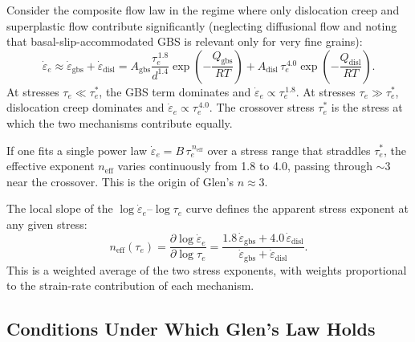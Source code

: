 \documentclass[11pt]{article}
\begin{document}
\begin{tcolorbox}[
  colback=orange!25,
  colframe=orange!70!black,
  title={\textbf{Derivation: $n \approx 3$ as a transitional value \cite{RanganathanMinchew2024}}}
]
Consider the composite flow law in the regime where only dislocation creep and superplastic flow contribute significantly (neglecting diffusional flow and noting that basal-slip-accommodated GBS is relevant only for very fine grains):
\begin{equation}
  \dot{\varepsilon}_e \approx \dot{\varepsilon}_{\text{gbs}} + \dot{\varepsilon}_{\text{disl}} = A_{\text{gbs}} \frac{\tau_e^{\,1.8}}{d^{1.4}} \exp\!\left(-\frac{Q_{\text{gbs}}}{RT}\right) + A_{\text{disl}}\, \tau_e^{\,4.0} \exp\!\left(-\frac{Q_{\text{disl}}}{RT}\right).
  \label{eq:two_mechanism}
\end{equation}
At stresses $\tau_e \ll \tau_e^*$, the GBS term dominates and $\dot{\varepsilon}_e \propto \tau_e^{\,1.8}$.  At stresses $\tau_e \gg \tau_e^*$, dislocation creep dominates and $\dot{\varepsilon}_e \propto \tau_e^{\,4.0}$.  The crossover stress $\tau_e^*$ is the stress at which the two mechanisms contribute equally.

\medskip
\noindent If one fits a single power law $\dot{\varepsilon}_e = B\,\tau_e^{\,n_{\text{eff}}}$ over a stress range that straddles $\tau_e^*$, the effective exponent $n_{\text{eff}}$ varies continuously from 1.8 to 4.0, passing through $\sim$3 near the crossover.  This is the origin of Glen's $n \approx 3$.

\medskip
\noindent The local slope of the $\log\dot{\varepsilon}_e$--$\log\tau_e$ curve defines the apparent stress exponent at any given stress:
\begin{equation}
  n_{\text{eff}}(\tau_e) = \frac{\partial \log \dot{\varepsilon}_e}{\partial \log \tau_e} = \frac{1.8\,\dot{\varepsilon}_{\text{gbs}} + 4.0\,\dot{\varepsilon}_{\text{disl}}}{\dot{\varepsilon}_{\text{gbs}} + \dot{\varepsilon}_{\text{disl}}}.
  \label{eq:n_eff}
\end{equation}
This is a weighted average of the two stress exponents, with weights proportional to the strain-rate contribution of each mechanism.
\end{tcolorbox}

\subsection{Conditions Under Which Glen's Law Holds}
\end{document}

